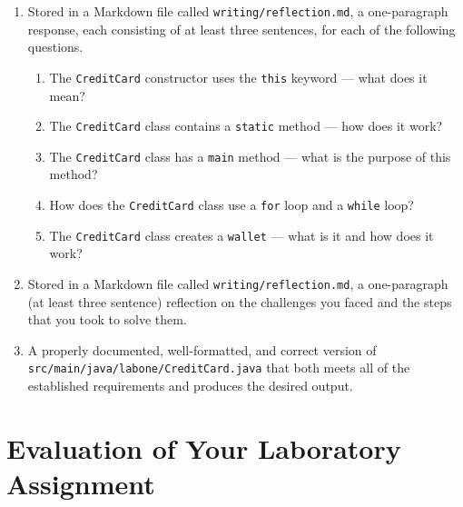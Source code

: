 \documentclass[11pt]{article}
\newcommand{\mainprogramsource}{\lstinline{src/main/java/labone/CreditCard.java}}
\newcommand{\reflection}{\lstinline{writing/reflection.md}}
\begin{document}
\begin{enumerate}

  \setlength{\itemsep}{0in}

\item Stored in a Markdown file called \reflection{}, a one-paragraph response, each consisting of at least three
  sentences, for each of the following questions.

  \begin{enumerate}
    \itemsep 0em

    \item The {\tt CreditCard} constructor uses the {\tt this} keyword --- what does it mean?

    \item The {\tt CreditCard} class contains a {\tt static} method --- how does it work?

    \item The {\tt CreditCard} class has a {\tt main} method --- what is the purpose of this method?

    \item How does the {\tt CreditCard} class use a {\tt for} loop and a {\tt while} loop?

    \item The {\tt CreditCard} class creates a {\tt wallet} --- what is it and how does it work?

  \end{enumerate}

\item Stored in a Markdown file called \reflection{}, a one-paragraph (at least three sentence) reflection on the
  challenges you faced and the steps that you took to solve them.

\item A properly documented, well-formatted, and correct version of \mainprogramsource{} that both meets all of the
  established requirements and produces the desired output.

\end{enumerate}

\section*{Evaluation of Your Laboratory Assignment}
\end{document}
